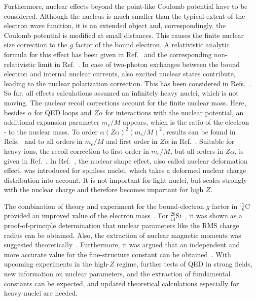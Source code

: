 Furthermore, nuclear effects beyond the point-like Coulomb potential have to be considered. Although the nucleus is much smaller than the typical extent of the electron wave function, it is an extended object and, correspondingly, the Coulomb potential is modified at small distances. This causes the finite nuclear size correction to the $g$ factor of the bound electron. A relativistic analytic formula for this effect has been given in Ref.~\cite{Glazov2002} and the corresponding non-relativistic limit in Ref.~\cite{karshenboim2000}. In case of two-photon exchanges between the bound electron and internal nuclear currents, also excited nuclear states contribute, leading to the nuclear polarization correction. This has been considered in Refs.~\cite{Nefiodov,volotka2014}. 
So far, all effects calculations assumed an infinitely heavy nuclei, which is not moving. The nuclear recoil corrections account for the finite nuclear mass. Here, besides $\alpha$ for QED loops and $Z\alpha$ for interactions with the nuclear potential, an additional expansion parameter $m_e/M$ appears, which is the ratio of the electron - to the nuclear mass. To order $\alpha(Z\alpha)^2(m_e/M)^2$, results can be found in Refs.~\cite{eides2010} and to all orders in $m_e/M$ and first order in $Z\alpha$ in Ref.~\cite{pachucki2010}. Suitable for heavy ions, the recoil correction to first order in $m_e/M$, but all orders in $Z\alpha$, is given in Ref.~\cite{shabaev2001,Shabaev2002}.
In Ref.~\cite{jacek2012}, the nuclear shape effect, also called nuclear deformation effect, was introduced for spinless nuclei, which takes a deformed nuclear charge distribution into account. It is not important for light nuclei, but scales strongly with the nuclear charge and therefore becomes important for high $Z$. 

The combination of theory and experiment for the bound-electron $g$ factor in $^{12}_{\phantom{0}6}$C provided an improved value of the electron mass~\cite{Kohler2015,Sturm2014,Zatorski2017}. For $^{28}_{14}$Si~\cite{Sturm2011}, it was shown as a proof-of-principle determination that nuclear parameters like the RMS charge radius can be obtained. Also, the extraction of nuclear magnetic moments was suggested theoretically~\cite{Yerokhin2011,Werth2001}. Furthermore, it was argued that an independent and more accurate value for the fine-structure constant can be obtained~\cite{Shabaev2006,yerokhin2016,Yerokhin2016PRA}. With upcoming experiments in the high-$Z$ regime, further tests of QED in strong fields, new information on nuclear parameters, and the extraction of fundamental constants can be expected, and updated theoretical calculations especially for heavy nuclei are needed.

